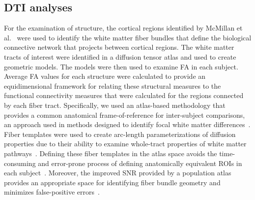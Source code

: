 \documentclass[final,authoryear,5p,times,twocolumn]{elsarticle}
\begin{document}
\subsection{DTI analyses}
For the examination of structure, the cortical regions identified by McMillan et al.\ \citep{McMillan2010} were used to identify the white matter fiber bundles that define the biological connective network that projects between cortical regions. The white matter tracts of interest were identified in a diffusion tensor atlas and used to create geometric models. The models were then used to examine FA in each subject. Average FA values for each structure were calculated to provide an equidimensional framework for relating these structural measures to the functional connectivity measures that were calculated for the regions connected by each fiber tract. Specifically, we used an atlas-based methodology that provides a common anatomical frame-of-reference for inter-subject comparisons, an approach used in methods designed to identify focal white matter differences~\citep{Yushkevich2008,Goodlett2009a,Jones2002,Xu2003,Smith2006}. Fiber templates were used to create arc-length parameterizations of diffusion properties due to their ability to examine whole-tract properties of white matter pathways~\citep{Jones2005,Corouge2006,Maddah2008d,Lin2006,ODonnell2009,Davis2009,Goodlett2009a,Batchelor2006}. Defining these fiber templates in the atlas space avoids the time-consuming and error-prone process of defining anatomically equivalent ROIs in each subject~\citep{Gilmore2007}. Moreover, the improved SNR provided by a population atlas provides an appropriate space for identifying fiber bundle geometry and minimizes false-positive errors~\citep{Goodlett2009a}. 
\end{document}
